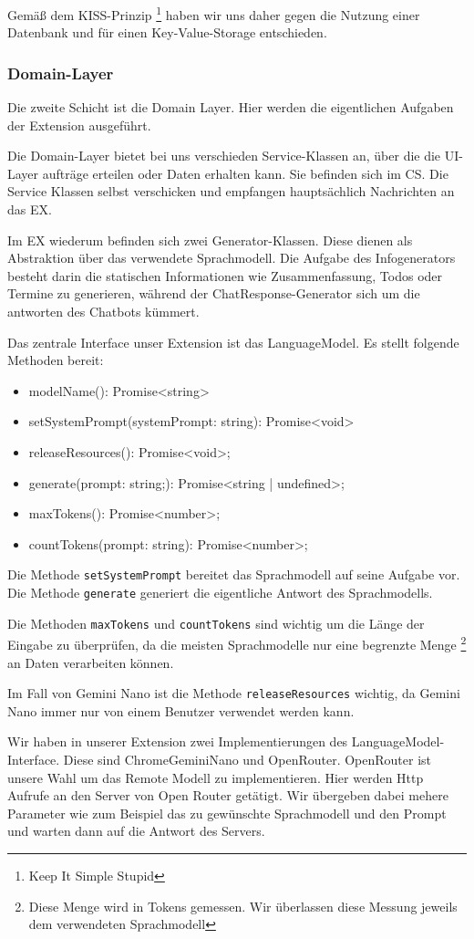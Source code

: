   Gemäß dem KISS-Prinzip \footnote{Keep It Simple Stupid} haben wir uns daher gegen die Nutzung einer Datenbank und für einen Key-Value-Storage entschieden.

  \subsubsection{Domain-Layer}
  Die zweite Schicht ist die Domain Layer. Hier werden die eigentlichen Aufgaben der Extension ausgeführt.

  Die Domain-Layer bietet bei uns verschieden Service-Klassen an, über die die UI-Layer aufträge erteilen oder Daten erhalten kann. Sie befinden sich im CS. Die Service Klassen selbst verschicken und empfangen hauptsächlich Nachrichten an das EX.

  Im EX wiederum befinden sich zwei Generator-Klassen. Diese dienen als Abstraktion über das verwendete Sprachmodell. Die Aufgabe des Infogenerators besteht darin die statischen Informationen wie Zusammenfassung, Todos oder Termine zu generieren, während der ChatResponse-Generator sich um die antworten des Chatbots kümmert.

  Das zentrale Interface unser Extension ist das LanguageModel. Es stellt folgende Methoden bereit:

  \begin{itemize}
    \item modelName(): Promise<string>
    \item setSystemPrompt(systemPrompt: string): Promise<void>
    \item releaseResources(): Promise<void>;
    \item generate(prompt: string;): Promise<string | undefined>;
    \item maxTokens(): Promise<number>;
    \item countTokens(prompt: string): Promise<number>;
  \end{itemize}

  Die Methode \texttt{setSystemPrompt} bereitet das Sprachmodell auf seine Aufgabe vor. Die Methode \texttt{generate} generiert die eigentliche Antwort des Sprachmodells.

  Die Methoden \texttt{maxTokens} und \texttt{countTokens} sind wichtig um die Länge der Eingabe zu überprüfen, da die meisten Sprachmodelle nur eine begrenzte Menge \footnote{Diese Menge wird in Tokens gemessen. Wir überlassen diese Messung jeweils dem verwendeten Sprachmodell} an Daten verarbeiten können.

  Im Fall von Gemini Nano ist die Methode \texttt{releaseResources} wichtig, da Gemini Nano immer nur von einem Benutzer verwendet werden kann.

  Wir haben in unserer Extension zwei Implementierungen des LanguageModel-Interface. Diese sind ChromeGeminiNano und OpenRouter. OpenRouter ist unsere Wahl um das Remote Modell zu implementieren. Hier werden Http Aufrufe an den Server von Open Router getätigt. Wir übergeben dabei mehere Parameter wie zum Beispiel das zu gewünschte Sprachmodell und den Prompt und warten dann auf die Antwort des Servers.
